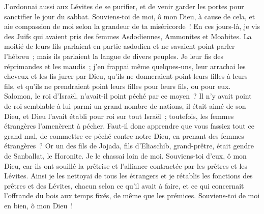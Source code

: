 \begin{multicols}{2}
J'ordonnai aussi aux Lévites de se purifier, et de venir garder les portes pour sanctifier le jour du sabbat. Souviens-toi de moi, ô mon Dieu, à cause de cela, et aie compassion de moi selon la grandeur de ta miséricorde~!
En ces jours-là, je vis des Juifs qui avaient pris des femmes Asdodiennes, Ammonites et Moabites.
La moitié de leurs fils parlaient en partie asdodien et ne savaient point parler l'hébreu~; mais ils parlaient la langue de divers peuples.
Je leur fis des réprimandes et les maudis~; j'en frappai même quelques-uns, leur arrachai les cheveux et les fis jurer par Dieu, qu'ils ne donneraient point leurs filles à leurs fils, et qu'ils ne prendraient point leurs filles pour leurs fils, ou pour eux.
Salomon, le roi d'Israël, n'avait-il point péché par ce moyen~? Il n'y avait point de roi semblable à lui parmi un grand nombre de nations, il était aimé de son Dieu, et Dieu l'avait établi pour roi sur tout Israël~; toutefois, les femmes étrangères l'amenèrent à pécher.
Faut-il donc apprendre que vous fassiez tout ce grand mal, de commettre ce péché contre notre Dieu, en prenant des femmes étrangères~?
Or un des fils de Jojada, fils d'Eliaschib, grand-prêtre, était gendre de Sanballat, le Horonite. Je le chassai loin de moi.
Souviens-toi d'eux, ô mon Dieu, car ils ont souillé la prêtrise et l'alliance contractée par les prêtres et les Lévites.
Ainsi je les nettoyai de tous les étrangers et je rétablis les fonctions des prêtres et des Lévites, chacun selon ce qu'il avait à faire,
et ce qui concernait l'offrande du bois aux temps fixés, de même que les prémices. Souviens-toi de moi en bien, ô mon Dieu~!
\PPE{}
\end{multicols}
